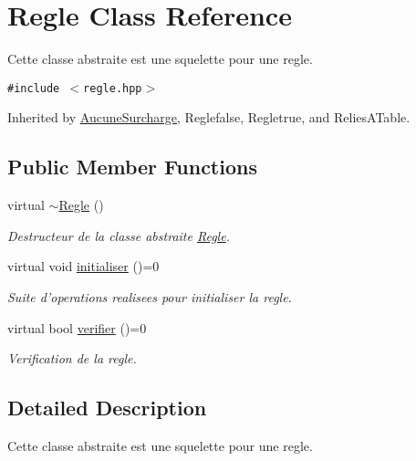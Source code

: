 \hypertarget{classRegle}{
\section{Regle Class Reference}
\label{classRegle}
}
Cette classe abstraite est une squelette pour une regle.  


{\tt \#include $<$regle.hpp$>$}

Inherited by \hyperlink{classAucuneSurcharge}{AucuneSurcharge}, Reglefalse, Regletrue, and ReliesATable.

\subsection*{Public Member Functions}
\begin{CompactItemize}
\item 
\hypertarget{classRegle_615167a483dfaaa0f7b85aa03253c3f2}{
virtual \hyperlink{classRegle_615167a483dfaaa0f7b85aa03253c3f2}{$\sim$Regle} ()}
\label{classRegle_615167a483dfaaa0f7b85aa03253c3f2}

\begin{CompactList}\small\item\em Destructeur de la classe abstraite \hyperlink{classRegle}{Regle}. \item\end{CompactList}\item 
\hypertarget{classRegle_b9a0850b2a83f2f0a8deaac82c4500c0}{
virtual void \hyperlink{classRegle_b9a0850b2a83f2f0a8deaac82c4500c0}{initialiser} ()=0}
\label{classRegle_b9a0850b2a83f2f0a8deaac82c4500c0}

\begin{CompactList}\small\item\em Suite d'operations realisees pour initialiser la regle. \item\end{CompactList}\item 
virtual bool \hyperlink{classRegle_4b3de9a64ec0e948e9177026afcc073d}{verifier} ()=0
\begin{CompactList}\small\item\em Verification de la regle. \item\end{CompactList}\end{CompactItemize}


\subsection{Detailed Description}
Cette classe abstraite est une squelette pour une regle. 

